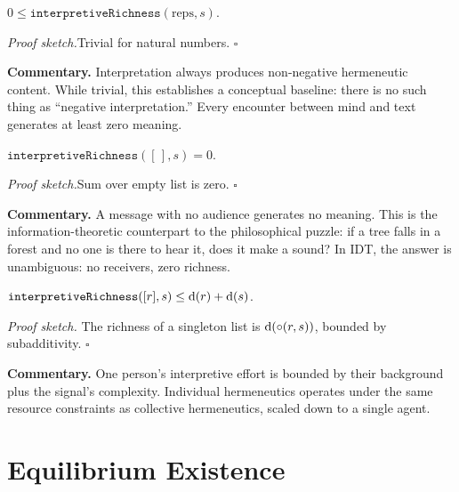 \begin{theorem}
\label{thm:richness_nonneg}
$0 \leq \texttt{interpretiveRichness}(\text{reps}, s)$.
\end{theorem}

\noindent\textit{Proof sketch.}\quad Trivial for natural numbers. \hfill$\square$

\medskip

\noindent\textbf{Commentary.}
Interpretation always produces non-negative hermeneutic content.  While
trivial, this establishes a conceptual baseline: there is no such thing as
``negative interpretation.''  Every encounter between mind and text
generates at least zero meaning.

\begin{theorem}
\label{thm:empty_richness}
$\texttt{interpretiveRichness}([\,], s) = 0$.
\end{theorem}

\noindent\textit{Proof sketch.}\quad Sum over empty list is zero. \hfill$\square$

\medskip

\noindent\textbf{Commentary.}
A message with no audience generates no meaning.  This is the
information-theoretic counterpart to the philosophical puzzle: if a tree
falls in a forest and no one is there to hear it, does it make a sound?
In IDT, the answer is unambiguous: no receivers, zero richness.

\begin{theorem}
\label{thm:singleton_richness_bound}
$\texttt{interpretiveRichness}([r], s) \leq \operatorname{d}(r) + \operatorname{d}(s)$.
\end{theorem}

\noindent\textit{Proof sketch.}\quad
The richness of a singleton list is $\operatorname{d}(\circ(r,s))$, bounded by
subadditivity.
\hfill$\square$

\medskip

\noindent\textbf{Commentary.}
One person's interpretive effort is bounded by their background plus the
signal's complexity.  Individual hermeneutics operates under the same
resource constraints as collective hermeneutics, scaled down to a single
agent.

\section{Equilibrium Existence}
\label{sec:ch20-equilibrium}

